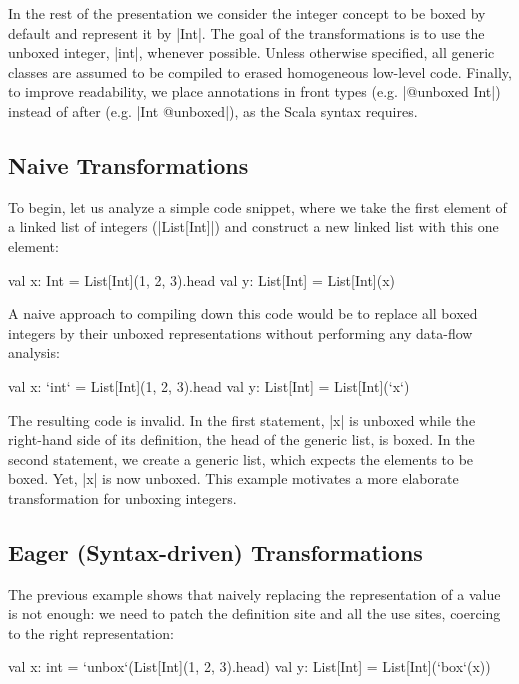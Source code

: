 In the rest of the presentation we consider the integer concept to be boxed by default and represent it by |Int|. The goal of the transformations is to use the unboxed integer, |int|, whenever possible. Unless otherwise specified, all generic classes are assumed to be compiled to erased homogeneous low-level code. Finally, to improve readability, we place annotations in front types (e.g. |@unboxed Int|) instead of after (e.g. |Int @unboxed|), as the Scala syntax requires.

\subsection{Naive Transformations}

To begin, let us analyze a simple code snippet, where we take the first element of a linked list of integers (|List[Int]|) and construct a new linked list with this one element:

\begin{lstlisting-nobreak}
 val x: Int = List[Int](1, 2, 3).head
 val y: List[Int] = List[Int](x)
\end{lstlisting-nobreak}

A naive approach to compiling down this code would be to replace all boxed integers by their unboxed representations without performing any data-flow analysis:

\begin{lstlisting-nobreak}
 val x: `int` = List[Int](1, 2, 3).head
 val y: List[Int] = List[Int](`x`)
\end{lstlisting-nobreak}

The resulting code is invalid. In the first statement, |x| is unboxed while the right-hand side of its definition, the head of the generic list, is boxed. In the second statement, we create a generic list, which expects the elements to be boxed. Yet, |x| is now unboxed. This example motivates a more elaborate transformation for unboxing integers.

\subsection{Eager (Syntax-driven) Transformations}

The previous example shows that naively replacing the representation of a value is not enough: we need to patch the definition site and all the use sites, coercing to the right representation:

\begin{lstlisting-nobreak}
 val x: int = `unbox`(List[Int](1, 2, 3).head)
 val y: List[Int] = List[Int](`box`(x))
\end{lstlisting-nobreak}

